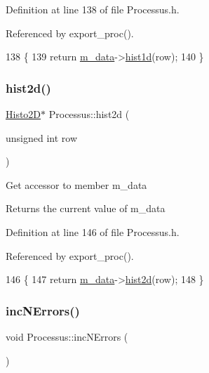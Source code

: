 Definition at line 138 of file Processus.\+h.



Referenced by export\+\_\+proc().


\begin{DoxyCode}
138                                    \{
139     \textcolor{keywordflow}{return} \hyperlink{classProcessus_a3da9a9de8af54e2f47807a3e09dfccff}{m\_data}->\hyperlink{classData_a476a66728ccfc553909d15b36c22492a}{hist1d}(row);
140   \}
\end{DoxyCode}
\mbox{\label{classProcessus_a73b5118cb5f2b5eaad33286183b86cfc}} 
\subsubsection{\texorpdfstring{hist2d()}{hist2d()}}
{\footnotesize\ttfamily \hyperlink{classHisto2D}{Histo2D}$\ast$ Processus\+::hist2d (\begin{DoxyParamCaption}\item[{unsigned int}]{row }\end{DoxyParamCaption})\hspace{0.3cm}{\ttfamily [inline]}}

Get accessor to member m\+\_\+data \begin{DoxyReturn}{Returns}
the current value of m\+\_\+data 
\end{DoxyReturn}


Definition at line 146 of file Processus.\+h.



Referenced by export\+\_\+proc().


\begin{DoxyCode}
146                                    \{
147     \textcolor{keywordflow}{return} \hyperlink{classProcessus_a3da9a9de8af54e2f47807a3e09dfccff}{m\_data}->\hyperlink{classData_ab717ebe242192605ad509b76df35e855}{hist2d}(row);
148   \}
\end{DoxyCode}
\mbox{\label{classProcessus_abe603d0636f76db6aa6c5c60cf34c591}} 
\subsubsection{\texorpdfstring{inc\+N\+Errors()}{incNErrors()}}
{\footnotesize\ttfamily void Processus\+::inc\+N\+Errors (\begin{DoxyParamCaption}{ }\end{DoxyParamCaption})}

